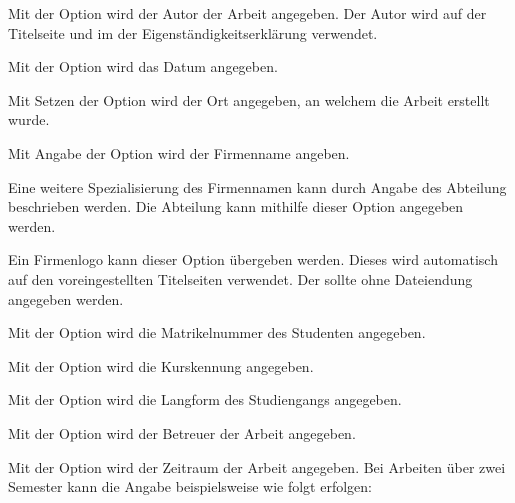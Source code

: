 \documentclass[babel=ngerman,highlight=false]{skdoc}
\begin{document}
                Mit der Option wird der Autor der Arbeit angegeben. Der Autor wird auf der Titelseite und im der Eigenständigkeitserklärung verwendet.\medskip

                Mit der Option wird das Datum angegeben.\medskip

                Mit Setzen der Option wird der Ort angegeben, an welchem die Arbeit erstellt wurde.\medskip

                Mit Angabe der Option wird der Firmenname angeben.\medskip

                Eine weitere Spezialisierung des Firmennamen kann durch Angabe des Abteilung beschrieben werden. Die Abteilung kann mithilfe dieser Option angegeben werden.\medskip

                Ein Firmenlogo kann dieser Option übergeben werden. Dieses wird automatisch auf den voreingestellten Titelseiten verwendet. Der  sollte ohne Dateiendung angegeben werden.\medskip

                Mit der Option wird die Matrikelnummer des Studenten angegeben.\medskip

                Mit der Option wird die Kurskennung angegeben.\medskip

                Mit der Option wird die Langform des Studiengangs angegeben.\medskip

                Mit der Option wird der Betreuer der Arbeit angegeben.\medskip

                Mit der Option wird der Zeitraum der Arbeit angegeben. Bei Arbeiten über zwei Semester kann die Angabe beispielsweise wie folgt erfolgen:
                \begin{sourcecode}
                \end{sourcecode}
                \medskip
\end{document}
